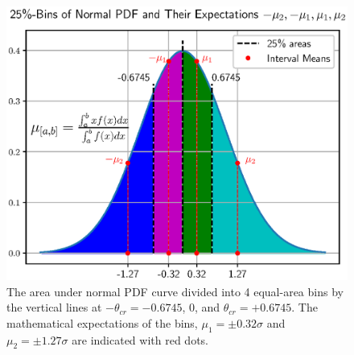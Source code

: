 \documentclass[letterpaper,twoside,12pt]{article}
\begin{document}
\begin{figure}[ht!]
  \begin{center}
  \includegraphics[width=35pc]{fig_25_percent_bins_and_expectations.eps}
  \caption{\small The area under normal PDF curve divided into 4 equal-area bins by the vertical lines at $-\theta_{cr} = -0.6745$, 0, and $\theta_{cr} = +0.6745$. The mathematical expectations of the bins, $\mu_1=\pm 0.32\sigma$ and $\mu_2=\pm 1.27\sigma$ are indicated with red dots.}
  \label{bins_25_pc}
  \end{center}
\end{figure}
\end{document}
